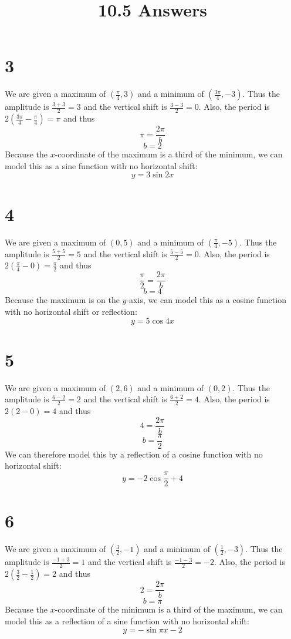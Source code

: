 \documentclass{article}
\title{10.5 Answers}
\theoremstyle{definition}
\newcommand{\?}{\stackrel{?}{=}}
\begin{document}
\maketitle

\section*{3}
We are given a maximum of $(\frac{\pi}{4},3)$ and a minimum of $(\frac{3\pi}{4},-3)$. Thus the amplitude is $\frac{3+3}{2}=3$ and the vertical shift is $\frac{3-3}{2}=0$. Also, the period is
$2(\frac{3\pi}{4}-\frac{\pi}{4})=\pi$ and thus \[ \pi=\frac{2\pi}{b} \] \[ b=2 \] Because the $x$-coordinate of the maximum is a third of the minimum, we can model this as a sine function with no 
horizontal shift:
\[ y=3\sin 2x \]

\section*{4}
We are given a maximum of $(0,5)$ and a minimum of $(\frac{\pi}{4},-5)$. Thus the amplitude is $\frac{5+5}{2}=5$ and the vertical shift is $\frac{5-5}{2}=0$. Also, the period is 
$2(\frac{\pi}{4}-0)=\frac{\pi}{2}$ and thus \[ \frac{\pi}{2}=\frac{2\pi}{b} \] \[ b=4 \] Because the maximum is on the $y$-axis, we can model this as a cosine function with no horizontal shift or reflection:
\[ y=5\cos 4x \]

\section*{5}
We are given a maximum of $(2,6)$ and a minimum of $(0,2)$. Thus the amplitude is $\frac{6-2}{2}=2$ and the vertical shift is $\frac{6+2}{2}=4$. Also, the period is
$2(2-0)=4$ and thus \[ 4=\frac{2\pi}{b} \] \[ b=\frac{\pi}{2} \] We can therefore model this by a reflection of a cosine function with no horizontal shift:
\[ y=-2\cos\frac{\pi}{2}+4 \]

\section*{6}
We are given a maximum of $(\frac{3}{2},-1)$ and a minimum of $(\frac{1}{2},-3)$. Thus the amplitude is $\frac{-1+3}{2}=1$ and the vertical shift is $\frac{-1-3}{2}=-2$. Also, the period is
$2(\frac{3}{2}-\frac{1}{2})=2$ and thus \[ 2=\frac{2\pi}{b} \] \[ b=\pi \] Because the $x$-coordinate of the minimum is a third of the maximum, we can model this as a reflection of a sine function with 
no horizontal shift:
\[ y=-\sin\pi x-2 \]
\end{document}
